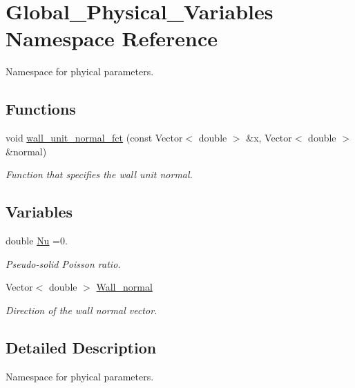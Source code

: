 \hypertarget{namespaceGlobal__Physical__Variables}{}\section{Global\+\_\+\+Physical\+\_\+\+Variables Namespace Reference}
\label{namespaceGlobal__Physical__Variables}


Namespace for phyical parameters.  


\subsection*{Functions}
\begin{DoxyCompactItemize}
\item 
void \hyperlink{namespaceGlobal__Physical__Variables_a0d48e8726fa485de2b2df2d5031ec41b}{wall\+\_\+unit\+\_\+normal\+\_\+fct} (const Vector$<$ double $>$ \&x, Vector$<$ double $>$ \&normal)
\begin{DoxyCompactList}\small\item\em Function that specifies the wall unit normal. \end{DoxyCompactList}\end{DoxyCompactItemize}
\subsection*{Variables}
\begin{DoxyCompactItemize}
\item 
double \hyperlink{namespaceGlobal__Physical__Variables_a3962c36313826b19f216f6bbbdd6a477}{Nu} =0.
\begin{DoxyCompactList}\small\item\em Pseudo-\/solid Poisson ratio. \end{DoxyCompactList}\item 
Vector$<$ double $>$ \hyperlink{namespaceGlobal__Physical__Variables_a5feb3df21fc4a0adefadecb8a8ed98d7}{Wall\+\_\+normal}
\begin{DoxyCompactList}\small\item\em Direction of the wall normal vector. \end{DoxyCompactList}\end{DoxyCompactItemize}


\subsection{Detailed Description}
Namespace for phyical parameters. 

